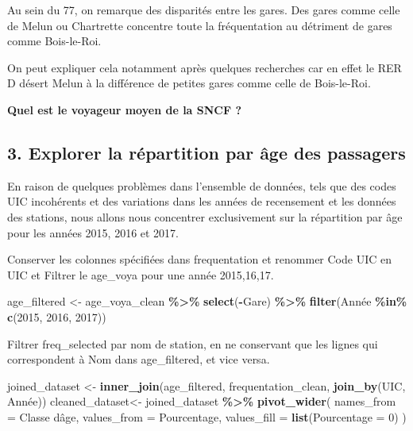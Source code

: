 \documentclass[
]{article}
\newenvironment{Shaded}{\begin{snugshade}}{\end{snugshade}}
\newcommand{\AttributeTok}[1]{\textcolor[rgb]{0.13,0.29,0.53}{#1}}
\newcommand{\DecValTok}[1]{\textcolor[rgb]{0.00,0.00,0.81}{#1}}
\newcommand{\FunctionTok}[1]{\textcolor[rgb]{0.13,0.29,0.53}{\textbf{#1}}}
\newcommand{\NormalTok}[1]{#1}
\newcommand{\OtherTok}[1]{\textcolor[rgb]{0.56,0.35,0.01}{#1}}
\newcommand{\SpecialCharTok}[1]{\textcolor[rgb]{0.81,0.36,0.00}{\textbf{#1}}}
\newcommand{\StringTok}[1]{\textcolor[rgb]{0.31,0.60,0.02}{#1}}
\begin{document}
Au sein du 77, on remarque des disparités entre les gares. Des gares
comme celle de Melun ou Chartrette concentre toute la fréquentation au
détriment de gares comme Bois-le-Roi.

On peut expliquer cela notamment après quelques recherches car en effet
le RER D désert Melun à la différence de petites gares comme celle de
Bois-le-Roi.

\textbf{Quel est le voyageur moyen de la SNCF ?}

\hypertarget{explorer-la-ruxe9partition-par-uxe2ge-des-passagers}{%
\subsection{3. Explorer la répartition par âge des
passagers}\label{explorer-la-ruxe9partition-par-uxe2ge-des-passagers}}

En raison de quelques problèmes dans l'ensemble de données, tels que des
codes UIC incohérents et des variations dans les années de recensement
et les données des stations, nous allons nous concentrer exclusivement
sur la répartition par âge pour les années 2015, 2016 et 2017.

Conserver les colonnes spécifiées dans frequentation et renommer Code
UIC en UIC et Filtrer le age\_voya pour une année 2015,16,17.

\begin{Shaded}
\begin{Highlighting}[]
\NormalTok{age\_filtered }\OtherTok{\textless{}{-}}\NormalTok{ age\_voya\_clean }\SpecialCharTok{\%\textgreater{}\%}
  \FunctionTok{select}\NormalTok{(}\SpecialCharTok{{-}}\NormalTok{Gare) }\SpecialCharTok{\%\textgreater{}\%}
  \FunctionTok{filter}\NormalTok{(Année }\SpecialCharTok{\%in\%} \FunctionTok{c}\NormalTok{(}\DecValTok{2015}\NormalTok{, }\DecValTok{2016}\NormalTok{, }\DecValTok{2017}\NormalTok{))}
\end{Highlighting}
\end{Shaded}

Filtrer freq\_selected par nom de station, en ne conservant que les
lignes qui correspondent à Nom dans age\_filtered, et vice versa.

\begin{Shaded}
\begin{Highlighting}[]
\NormalTok{joined\_dataset }\OtherTok{\textless{}{-}} \FunctionTok{inner\_join}\NormalTok{(age\_filtered, frequentation\_clean, }\FunctionTok{join\_by}\NormalTok{(UIC, Année))}
\NormalTok{cleaned\_dataset}\OtherTok{\textless{}{-}}\NormalTok{ joined\_dataset }\SpecialCharTok{\%\textgreater{}\%}
  \FunctionTok{pivot\_wider}\NormalTok{(}
    \AttributeTok{names\_from =} \StringTok{\textasciigrave{}}\AttributeTok{Classe d\textquotesingle{}âge}\StringTok{\textasciigrave{}}\NormalTok{, }
    \AttributeTok{values\_from =}\NormalTok{ Pourcentage, }
    \AttributeTok{values\_fill =} \FunctionTok{list}\NormalTok{(}\AttributeTok{Pourcentage =} \DecValTok{0}\NormalTok{)  }
\NormalTok{  )}
\end{Highlighting}
\end{Shaded}
\end{document}
